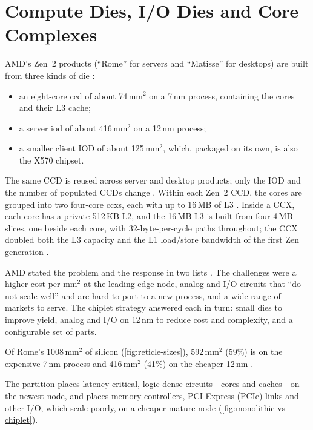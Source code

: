 \section{Compute Dies, I/O Dies and Core Complexes}
\label{sec:ccd-iod}



AMD's Zen~2 products (``Rome'' for servers and ``Matisse'' for desktops) are built from three kinds of die \cite{naffziger2020chiplet,suggs2019zen2}:
\begin{itemize}
  \item an eight-core \gls{ccd} of about 74\,mm$^2$ on a 7\,nm process, containing the cores and their L3 cache;
  \item a server \gls{iod} of about 416\,mm$^2$ on a 12\,nm process;
  \item a smaller client IOD of about 125\,mm$^2$, which, packaged on its own, is also the X570 chipset.
\end{itemize}
The same CCD is reused across server and desktop products; only the IOD and the number of populated CCDs change \cite{naffziger2020chiplet}. Within each Zen~2 CCD, the cores are grouped into two four-core \glspl{ccx}, each with up to 16\,MB of L3 \cite{suggs2019zen2}. Inside a CCX, each core has a private 512\,KB L2, and the 16\,MB L3 is built from four 4\,MB slices, one beside each core, with 32-byte-per-cycle paths throughout; the CCX doubled both the L3 capacity and the L1 load/store bandwidth of the first Zen generation \cite[slide~12]{suggs2019zen2}.

AMD stated the problem and the response in two lists \cite[slide~13]{suggs2019zen2}. The challenges were a higher cost per mm$^2$ at the leading-edge node, analog and I/O circuits that ``do not scale well'' and are hard to port to a new process, and a wide range of markets to serve. The chiplet strategy answered each in turn: small dies to improve yield, analog and I/O on 12\,nm to reduce cost and complexity, and a configurable set of parts.

Of Rome's 1008\,mm$^2$ of silicon (\cref{fig:reticle-sizes}), 592\,mm$^2$ (59\%) is on the expensive 7\,nm process and 416\,mm$^2$ (41\%) on the cheaper 12\,nm \cite{naffziger2020chiplet}.

The partition places latency-critical, logic-dense circuits---cores and caches---on the newest node, and places memory controllers, PCI Express (PCIe) links and other I/O, which scale poorly, on a cheaper mature node (\cref{fig:monolithic-vs-chiplet}).


